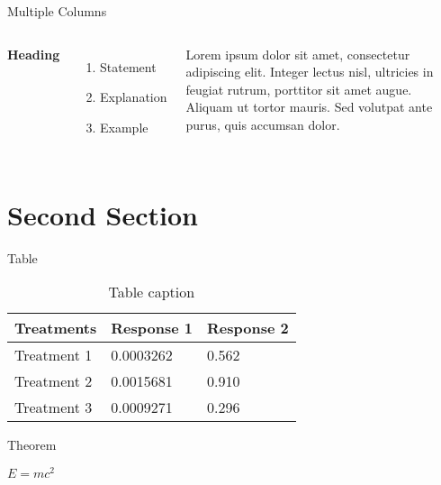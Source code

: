 \documentclass[aspectratio=169,xcolor=dvipsnames]{beamer}
\begin{document}

\begin{frame}{Multiple Columns}
  \begin{columns}[c] %

    \textbf{Heading}
    \begin{enumerate}
      \item Statement
      \item Explanation
      \item Example
    \end{enumerate}

    Lorem ipsum dolor sit amet, consectetur adipiscing elit. Integer lectus nisl, ultricies in feugiat rutrum, porttitor sit amet augue. Aliquam ut tortor mauris. Sed volutpat ante purus, quis accumsan dolor.

  \end{columns}
\end{frame}

\section{Second Section}

\begin{frame}{Table}
  \begin{table}
    \begin{tabular}{l l l}
      \toprule
      \textbf{Treatments} & \textbf{Response 1} & \textbf{Response 2} \\
      \midrule
      Treatment 1         & 0.0003262           & 0.562               \\
      Treatment 2         & 0.0015681           & 0.910               \\
      Treatment 3         & 0.0009271           & 0.296               \\
      \bottomrule
    \end{tabular}
    \caption{Table caption}
  \end{table}
\end{frame}


\begin{frame}{Theorem}
  \begin{theorem}
    $E = mc^2$
  \end{theorem}
\end{frame}
\end{document}

